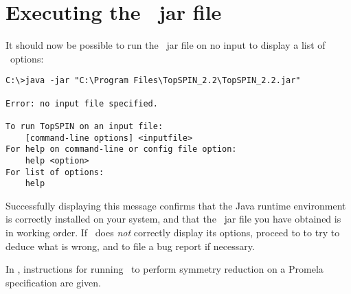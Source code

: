 \section{Executing the \protect\topspin\ jar file}
%
It should now be possible to run the \topspin\ jar file on no input
to display a list of \topspin\ options:
%
\begin{lstlisting}
C:\>java -jar "C:\Program Files\TopSPIN_2.2\TopSPIN_2.2.jar"

Error: no input file specified.

To run TopSPIN on an input file:
    [command-line options] <inputfile>
For help on command-line or config file option:
    help <option>
For list of options:
    help
\end{lstlisting}
%
Successfully displaying this message
confirms that the Java runtime environment is correctly installed on
your system, and that the \topspin\ jar file you have obtained is in
working order.  If \topspin\ does \emph{not} correctly display its
options, proceed to  to try to deduce what
is wrong, and to file a bug report if necessary.

In , instructions for running \topspin\ to perform
symmetry reduction on a Promela specification are given.

